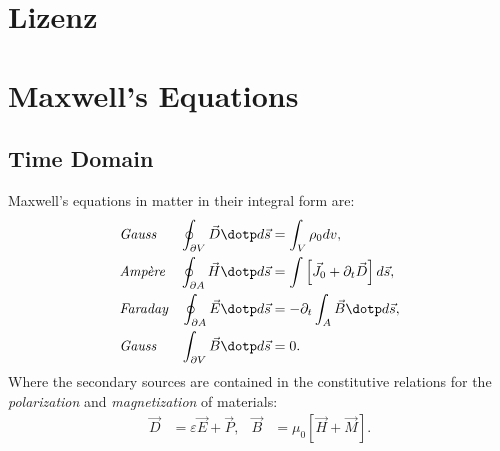 \documentclass[margin=tiny]{hsrzf}
\author{\textsl{Naoki Sean Pross} -- \texttt{\theauthoremail}}
\title{\themodule}
\date{\thesemester}
\begin{document}

\maketitle



\section*{Lizenz}
\doclicenseThis

\tableofcontents

\clearpage
\setcounter{page}{1}

\twocolumn

\section{Maxwell's Equations}

\subsection{Time Domain}

Maxwell's equations in matter in their integral form are:
\begin{align*}
  &\textit{Gauss} &
    \oint_{\partial V} \vec{D} \dotp d\vec{s}
    &= \int_V \rho_0 dv, \\
  &\textit{Ampère} &
    \oint_{\partial A} \vec{H} \dotp d\vec{s}
    &= \int \left[ \vec{J}_0 + \partial_t \vec{D} \right] d\vec{s}, \\
  &\textit{Faraday} &
    \oint_{\partial A} \vec{E} \dotp d\vec{s} 
    &= -\partial_t \int_A \vec{B} \dotp d\vec{s}, \\
  &\textit{Gauss} &
    \int_{\partial V} \vec{B} \dotp d\vec{s}
    &= 0.
\end{align*}
Where the secondary sources are contained in the constitutive relations for
the \emph{polarization} and \emph{magnetization} of materials:
\begin{align*}
  \vec{D} &= \varepsilon \vec{E} + \vec{P}, &
  \vec{B} &= \mu_0 \left[ \vec{H} + \vec{M} \right].
\end{align*}
\end{document}
